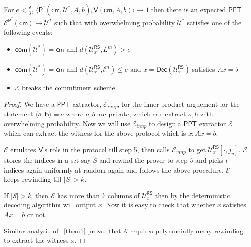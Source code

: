 \documentclass[runningheads]{llncs}
\newcommand{\innp}[2]{\langle #1,#2\rangle}
\def\ppt{\mathsf{PPT}}
\def\extrac{\mathcal{E}}
\def\prover{\mathsf{P}}
\def\verifier{\mathsf{V}}
\def\RS{\mathsf{RS}} %
\def\cm{\mathsf{cm}} %
\def\com{\mathsf{com}} %
\def\oracle{\mathcal{U}^{\RS}}
\def\dec{\mathsf{Dec}}
\def\calU{\mathcal{U}}
\begin{document}
	\begin{theorem}
		For $e < \frac{d}{3} $, $\innp{\prover^*(\cm, \calU^*, A, b)}{\verifier(\cm, A, b)} \rightarrow 1 $ then there is an expected $\ppt$ $\extrac^{\prover^*}(\cm) \rightarrow \calU^*$ such that with overwhelming probability $\calU^*$ satisfies one of the following events:
		\begin{itemize}
			\item $\com(\calU^*)=\cm$ and $d(\oracle_x,L^m) > e $
			\item $\com(\calU^*)=\cm$ and $d(\oracle_x, l^m)\leq e \text{ and } x = \dec(\oracle_x)$ satisfies $ Ax = b$
			\item $\extrac$ breaks the commitment scheme.
		\end{itemize}
 	\begin{comment}	
	 There is an $\ppt$ extractor $\extrac$ which has oracle access to $\prover$ such that rewinding a certain step of $\prover$, $\extrac$ can output the witness $x$ for which $Ax=b$ holds with overwhelming probability.
	\end{comment}
	
	\end{theorem}
	\begin{proof}
	We have a $\ppt$ extractor, $\extrac_{innp}$, for the inner product arguement for the statement $\innp{\bm{a}}{\bm{b}}=c$ where $a,b$ are private, which can extract $a, b$ with overwhelming probability. Now we will use $\extrac_{innp}$ to design a $\ppt$ extractor $\extrac$ which can extract the witness for the above protocol which is $x : Ax=b$.
	
	 $\extrac$ emulates $\verifier$'s role in the protocol till step 5, then calls $\extrac_{innp}$ to get $\oracle_x[\cdot,j_u]$. $\extrac$ stores the indices in a set say $S$ and rewind the prover to step 5 and picks $t$ indices again uniformly at random again and follows the above procedure. $\extrac$ keeps rewinding till $|S|>k$.
	 
	 If $|S|>k$, then $\extrac$ has more than $k$ columns of $\oracle_x$ then by the deterministic decoding algorithm will output $x$. Now it is easy to check that whether $x$ satisfies $Ax=b$ or not. 
	 
	 Similar analysis of ~\ref{theo:1} proves that $\extrac$ requires polynomially many rewinding to extract the witness $x$.
	\end{proof}
\end{document}
